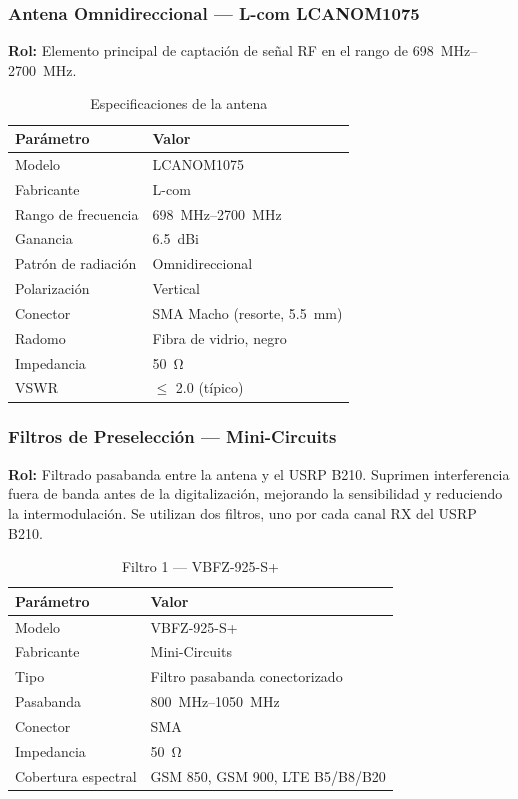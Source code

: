 \documentclass[12pt,a4paper]{article}
\begin{document}
\subsubsection{Antena Omnidireccional --- L-com LCANOM1075}

\textbf{Rol:} Elemento principal de captación de señal RF en el rango de \qtyrange{698}{2700}{\MHz}.

\begin{table}[H]
\centering
\caption{Especificaciones de la antena}
\begin{tabular}{@{}ll@{}}
\toprule
\textbf{Parámetro} & \textbf{Valor} \\
\midrule
Modelo & LCANOM1075 \\
Fabricante & L-com \\
Rango de frecuencia & \qtyrange{698}{2700}{\MHz} \\
Ganancia & 6.5~dBi \\
Patrón de radiación & Omnidireccional \\
Polarización & Vertical \\
Conector & SMA Macho (resorte, \qty{5.5}{\mm}) \\
Radomo & Fibra de vidrio, negro \\
Impedancia & \qty{50}{\ohm} \\
VSWR & $\leq$ 2.0 (típico) \\
\bottomrule
\end{tabular}
\end{table}

\subsubsection{Filtros de Preselección --- Mini-Circuits}

\textbf{Rol:} Filtrado pasabanda entre la antena y el USRP B210. Suprimen interferencia fuera de banda antes de la digitalización, mejorando la sensibilidad y reduciendo la intermodulación. Se utilizan dos filtros, uno por cada canal RX del USRP B210.

\begin{table}[H]
\centering
\caption{Filtro 1 --- VBFZ-925-S+}
\begin{tabular}{@{}ll@{}}
\toprule
\textbf{Parámetro} & \textbf{Valor} \\
\midrule
Modelo & VBFZ-925-S+ \\
Fabricante & Mini-Circuits \\
Tipo & Filtro pasabanda conectorizado \\
Pasabanda & \qtyrange{800}{1050}{\MHz} \\
Conector & SMA \\
Impedancia & \qty{50}{\ohm} \\
Cobertura espectral & GSM 850, GSM 900, LTE B5/B8/B20 \\
\bottomrule
\end{tabular}
\end{table}
\end{document}
